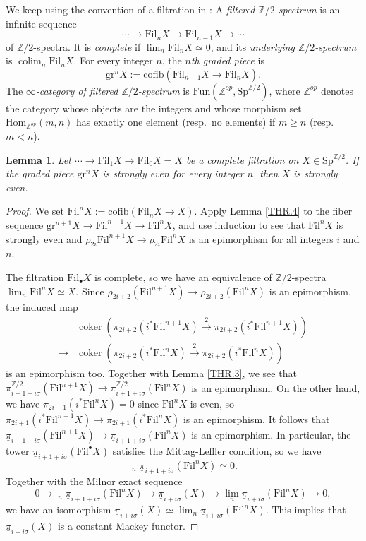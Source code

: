 \documentclass[10pt]{amsart}
\newtheorem{lem}[thm]{Lemma}
\theoremstyle{definition}
\numberwithin{equation}{section}
\newcommand{\Z}{\mathbb{Z}}
\newcommand{\ul}{\underline}
\DeclareMathOperator{\coker}{coker}
\newcommand{\Fun}{\mathrm{Fun}}
\newcommand{\Sp}{\mathrm{Sp}}
\newcommand{\Hom}{\mathrm{Hom}}
\newcommand{\cofib}{\mathrm{cofib}}
\newcommand{\gr}{\mathrm{gr}}
\newcommand{\Fil}{\mathrm{Fil}}
\newcommand{\colim}{\mathop{\mathrm{colim}}}
\begin{document}
{We keep using the convention of a filtration in \cite[Definition 4.18]{HP}:
A \emph{filtered $\Z/2$-spectrum} is an infinite sequence
\[
\cdots \to \Fil_n X\to \Fil_{n-1} X\to \cdots
\]
of $\Z/2$-spectra.
It is \emph{complete} if $\lim_n \Fil_n X\simeq 0$,
and its \emph{underlying $\Z/2$-spectrum} is $\colim_n \Fil_n X$.
For every integer $n$,
the \emph{$n$th graded piece} is
\[
\gr^nX:=\cofib(\Fil_{n+1} X\to \Fil_{n} X).
\]
The \emph{$\infty$-category of filtered $\Z/2$-spectrum} is $\Fun(\Z^{op},\Sp^{\Z/2})$,
where $\Z^{op}$ denotes the category whose objects are the integers and whose morphism set $\Hom_{\Z^{op}}(m,n)$ has exactly one element (resp.\ no elements) if $m\geq n$ (resp.\ $m<n$).


\begin{lem}
\label{THR.5}
Let $\cdots \to \Fil_1X\to \Fil_0X=X$ be a complete filtration on $X\in \Sp^{\Z/2}$.
If the graded piece $\gr^n X$ is strongly even for every integer $n$,
then $X$ is strongly even.
\end{lem}
\begin{proof}
We set $\Fil^nX:=\cofib(\Fil_nX\to X)$.
Apply Lemma \ref{THR.4} to the fiber sequence $\gr^{n+1}X\to \Fil^{n+1}X\to \Fil^nX$,
and use induction to see that $\Fil^{n}X$ is strongly even and $\rho_{2i}\Fil^{n+1} X\to \rho_{2i}\Fil^{n} X$ is an epimorphism for all integers $i$ and $n$.

The filtration $\Fil_\bullet X$ is complete,
so we have an equivalence of $\Z/2$-spectra $\lim_n \Fil^n X\simeq X$.
Since $\rho_{2i+2}(\Fil^{n+1}X)\to \rho_{2i+2}(\Fil^n X)$ is an epimorphism,
the induced map
\begin{align*}
&\coker(\pi_{2i+2}(i^* \Fil^{n+1} X)\xrightarrow{2} \pi_{2i+2}(i^* \Fil^{n+1} X))
\\
\to &
\coker(\pi_{2i+2}(i^* \Fil^n X)\xrightarrow{2} \pi_{2i+2}(i^* \Fil^n X))
\end{align*}
is an epimorphism too.
Together with Lemma \ref{THR.3},
we see that $\pi_{i+1+i\sigma}^{\Z/2}(\Fil^{n+1}X)\to \pi_{i+1+i\sigma}^{\Z/2}(\Fil^n X)$ is an epimorphism.
On the other hand,
we have
$\pi_{2i+1}(i^*\Fil^n X)=0$ since $\Fil^n X$ is even,
so $\pi_{2i+1}(i^*\Fil^{n+1}X)\to \pi_{2i+1}(i^*\Fil^n X)$ is an epimorphism.
It follows that $\ul{\pi}_{i+1+i\sigma}(\Fil^{n+1}X)\to \ul{\pi}_{i+1+i\sigma}(\Fil^n X)$ is an epimorphism.
In particular, the tower $\ul{\pi}_{i+1+i\sigma}(\Fil^\bullet X)$ satisfies the Mittag-Leffler condition, so we have
\[
\mathop{\mathrm{lim}^1}_n \ul{\pi}_{i+1+i\sigma} (\Fil^n X)
\simeq
0.
\]
Together with the Milnor exact sequence
\[
0
\to
\mathop{\mathrm{lim}^1}_n \ul{\pi}_{i+1+i\sigma} (\Fil^n X)
\to
\ul{\pi}_{i+i\sigma} (X)
\to
\lim_n \ul{\pi}_{i+i\sigma} (\Fil^n X)
\to
0,
\]
we have an isomorphism $\ul{\pi}_{i+i\sigma} (X)\simeq \lim_n \ul{\pi}_{i+i\sigma} (\Fil^n X)$.
This implies that $\ul{\pi}_{i+i\sigma} (X)$ is a constant Mackey functor.


\end{proof}}
\end{document}

